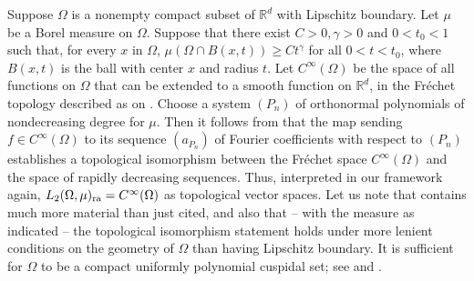 \documentclass[12pt, reqno]{amsart}
\numberwithin{equation}{section}
\theoremstyle{plain}
\theoremstyle{definition}
\begin{document}
Suppose $\Omega$ is a nonempty compact subset of ${{\mathbb R}}^d$ with Lipschitz boundary. Let $\mu$ be a Borel measure on $\Omega$. Suppose that there exist $C>0,\gamma>0$ and $0<t_0<1$ such that, for every $x$ in $\Omega$, $\mu(\Omega\cap B(x,t))\geq C t^\gamma$ for all $0<t<t_{0}$, where $B(x,t)$ is the ball with center $x$ and radius $t$. Let $C^\infty(\Omega)$ be the space of all functions on $\Omega$ that can be extended to a smooth function on ${{\mathbb R}}^d$, in the Fr\'echet topology described as on \cite[p.~689]{Zeriahi}. Choose a system ${({P_n})}$ of orthonormal polynomials of nondecreasing degree for $\mu$. Then it follows from \cite[Th\'eor\`eme~3.1]{Zeriahi} that the map sending $f\in C^\infty(\Omega)$ to its sequence ${({a_{P_n}})}$ of Fourier coefficients with respect to ${({P_n})}$ establishes a topological isomorphism between the Fr\'echet space $C^\infty(\Omega)$ and the space of rapidly decreasing sequences. Thus, interpreted in our framework again, $L_2(\Omega,\mu)_{\textup{ra}}= C^\infty(\Omega)$ as topological vector spaces. Let us note that \cite{Zeriahi} contains much more material than just cited, and also that -- with the measure as indicated -- the topological isomorphism statement holds under more lenient conditions on the geometry of $\Omega$ than having Lipschitz boundary. It is sufficient for $\Omega$ to be a compact uniformly polynomial cuspidal set; see \cite{PawPle} and \cite[p.~684]{Zeriahi}.
\end{document}

